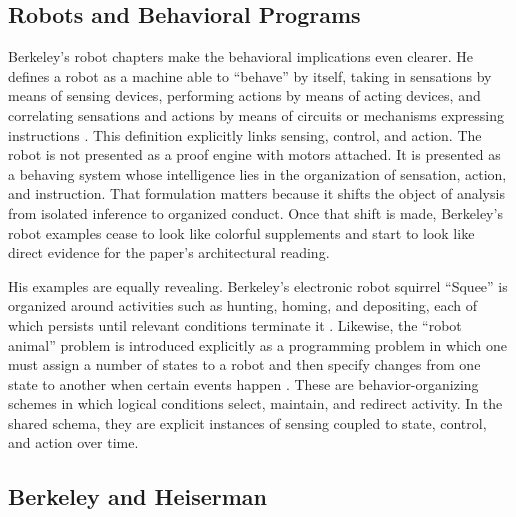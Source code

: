 \documentclass[11pt]{article}
\begin{document}
\subsection*{Robots and Behavioral Programs}

Berkeley's robot chapters make the behavioral implications even clearer. He defines a robot as a machine able to ``behave'' by itself, taking in sensations by means of sensing devices, performing actions by means of acting devices, and correlating sensations and actions by means of circuits or mechanisms expressing instructions \citep[pp.~177--178]{berkeley1959symbolic}. This definition explicitly links sensing, control, and action. The robot is not presented as a proof engine with motors attached. It is presented as a behaving system whose intelligence lies in the organization of sensation, action, and instruction. That formulation matters because it shifts the object of analysis from isolated inference to organized conduct. Once that shift is made, Berkeley's robot examples cease to look like colorful supplements and start to look like direct evidence for the paper's architectural reading.

His examples are equally revealing. Berkeley's electronic robot squirrel ``Squee'' is organized around activities such as hunting, homing, and depositing, each of which persists until relevant conditions terminate it \citep[pp.~177--180]{berkeley1959symbolic}. Likewise, the ``robot animal'' problem is introduced explicitly as a programming problem in which one must assign a number of states to a robot and then specify changes from one state to another when certain events happen \citep[pp.~177, 180--181]{berkeley1959symbolic}. These are behavior-organizing schemes in which logical conditions select, maintain, and redirect activity. In the shared schema, they are explicit instances of sensing coupled to state, control, and action over time.

\subsection*{Berkeley and Heiserman}
\end{document}
